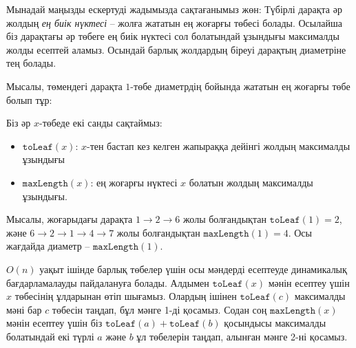 Мынадай маңызды ескертуді жадымызда сақтағанымыз жөн: Түбірлі дарақта әр
жолдың \emph{ең биік нүктесі} -- жолға жататын 
ең жоғарғы төбесі болады. Осылайша біз дарақтағы әр төбеге
ең биік нүктесі сол болатындай ұзындығы 
максималды жолды есептей аламыз. Осындай барлық
жолдардың біреуі дарақтың диаметріне тең болады.

Мысалы, төмендегі дарақта $1$-төбе 
диаметрдің бойында жататын ең жоғарғы төбе болып тұр:

\begin{center}
\end{center}

Біз әр $x$-төбеде екі санды сақтаймыз:
\begin{itemize}
\item $\texttt{toLeaf}(x)$: $x$-тен бастап кез келген жапыраққа
дейінгі жолдың максималды ұзындығы
\item $\texttt{maxLength}(x)$: ең жоғарғы нүктесі $x$ болатын жолдың максималды ұзындығы.
\end{itemize}
Мысалы, жоғарыдағы дарақта
$1 \rightarrow 2 \rightarrow 6$ жолы болғандықтан
$\texttt{toLeaf}(1)=2$,
және $6 \rightarrow 2 \rightarrow 1 \rightarrow 4 \rightarrow 7$ 
жолы болғандықтан $\texttt{maxLength}(1)=4$.
Осы жағдайда диаметр -- $\texttt{maxLength}(1)$.

$O(n)$ уақыт ішінде барлық төбелер үшін осы мәндерді есептеуде динамикалық бағдарламалауды пайдалануға 
болады. Алдымен $\texttt{toLeaf}(x)$ мәнін 
есептеу үшін $x$ төбесінің ұлдарынан өтіп шығамыз. Олардың ішінен 
$\texttt{toLeaf}(c)$ максималды мәні бар
$c$ төбесін таңдап, бұл мәнге 1-ді қосамыз. Содан соң $\texttt{maxLength}(x)$ мәнін есептеу үшін
біз $\texttt{toLeaf}(a) + \texttt{toLeaf}(b)$ қосындысы максималды болатындай екі түрлі $a$ және $b$ ұл төбелерін таңдап, алынған мәнге 2-ні қосамыз. 


